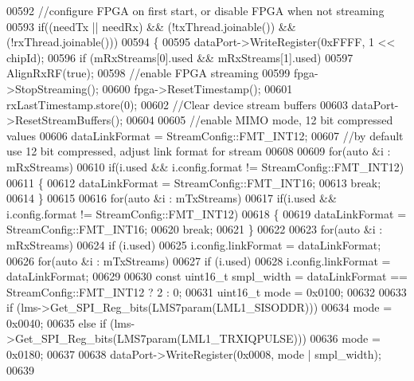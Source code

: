 \begin{DoxyCode}
00592     \textcolor{comment}{//configure FPGA on first start, or disable FPGA when not streaming}
00593     \textcolor{keywordflow}{if}((needTx || needRx) && (!txThread.joinable()) && (!rxThread.joinable()))
00594     \{
00595         dataPort->WriteRegister(0xFFFF, 1 << chipId);
00596         \textcolor{keywordflow}{if} (mRxStreams[0].used && mRxStreams[1].used)
00597             AlignRxRF(\textcolor{keyword}{true});
00598         \textcolor{comment}{//enable FPGA streaming}
00599         fpga->StopStreaming();
00600         fpga->ResetTimestamp();
00601         rxLastTimestamp.store(0);
00602         \textcolor{comment}{//Clear device stream buffers}
00603         dataPort->ResetStreamBuffers();
00604 
00605         \textcolor{comment}{//enable MIMO mode, 12 bit compressed values}
00606         dataLinkFormat = StreamConfig::FMT_INT12;
00607         \textcolor{comment}{//by default use 12 bit compressed, adjust link format for stream}
00608 
00609         \textcolor{keywordflow}{for}(\textcolor{keyword}{auto} &i : mRxStreams)
00610             \textcolor{keywordflow}{if}(i.used && i.config.format != StreamConfig::FMT_INT12)
00611             \{
00612                 dataLinkFormat = StreamConfig::FMT_INT16;
00613                 \textcolor{keywordflow}{break};
00614             \}
00615 
00616         \textcolor{keywordflow}{for}(\textcolor{keyword}{auto} &i : mTxStreams)
00617             \textcolor{keywordflow}{if}(i.used && i.config.format != StreamConfig::FMT_INT12)
00618             \{
00619                 dataLinkFormat = StreamConfig::FMT_INT16;
00620                 \textcolor{keywordflow}{break};
00621             \}
00622 
00623         \textcolor{keywordflow}{for}(\textcolor{keyword}{auto} &i : mRxStreams)
00624             \textcolor{keywordflow}{if} (i.used)
00625                 i.config.linkFormat = dataLinkFormat;
00626         \textcolor{keywordflow}{for}(\textcolor{keyword}{auto} &i : mTxStreams)
00627             \textcolor{keywordflow}{if} (i.used)
00628                 i.config.linkFormat = dataLinkFormat;
00629 
00630         \textcolor{keyword}{const} uint16\_t smpl\_width = dataLinkFormat == StreamConfig::FMT_INT12 ? 2 : 0;
00631         uint16\_t mode = 0x0100;
00632 
00633         \textcolor{keywordflow}{if} (lms->Get_SPI_Reg_bits(LMS7param(LML1\_SISODDR)))
00634             mode = 0x0040;
00635         \textcolor{keywordflow}{else} \textcolor{keywordflow}{if} (lms->Get_SPI_Reg_bits(LMS7param(LML1\_TRXIQPULSE)))
00636             mode = 0x0180;
00637 
00638         dataPort->WriteRegister(0x0008, mode | smpl\_width);
00639 

\end{DoxyCode}
